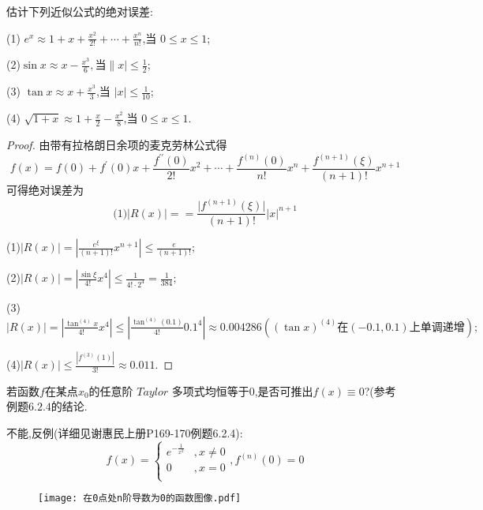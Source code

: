 \documentclass[lang=cn,newtx,10pt,scheme=chinese]{../Template/elegantbook}
\begin{document}
\begin{exercise}
估计下列近似公式的绝对误差:

(1) \(e^{x}\approx1 + x+\frac{x^{2}}{2!}+\cdots+\frac{x^{n}}{n!}\),当 \(0\leq x\leq1\);

(2)$\sin x\approx x-\frac{x^3}{6},当\|x|\le\frac{1}{2}$;

(3) \(\tan x\approx x+\frac{x^{3}}{3}\),当 \(\vert x\vert\leq\frac{1}{10}\);

(4) \(\sqrt{1 + x}\approx1+\frac{x}{2}-\frac{x^{2}}{8}\),当 \(0\leq x\leq1\).
\begin{proof}
    由带有拉格朗日余项的麦克劳林公式得
    \begin{equation}
    f(x)=f(0)+f^{\prime}(0)x+\frac{f^{\prime\prime}(0)}{2!}x^{2}+\cdots+\frac{f^{(n)}(0)}{n!}x^{n}+\frac{f^{(n + 1)}(\xi)}{(n + 1)!}x^{n + 1}
    \nonumber
    \end{equation}
    可得绝对误差为
    \begin{equation}
        \mathbf{(}1)|R\left( x \right) |==\frac{\vert f^{(n + 1)}(\xi)\vert}{(n + 1)!}\vert x\vert^{n + 1}
        \nonumber
    \end{equation}

        (1)$|R\left( x \right) |=\left| \frac{e^{\xi}}{\left( n+1 \right) !}x^{n+1} \right|\le \frac{e}{\left( n+1 \right) !};$
        
        (2)$|R\left( x \right) |=\left| \frac{\sin \xi}{4!}x^4 \right|\le \frac{1}{4!\cdot 2^4}=\frac{1}{384};$

        (3)$|R\left( x \right) |=\left| \frac{\tan ^{\left( 4 \right)}x}{4!}x^4 \right|\le \left| \frac{\tan ^{\left( 4 \right)}\left( 0.1 \right)}{4!}0.1^4 \right|\approx 0.004286 \left( \left( \tan x \right) ^{\left( 4 \right)}\text{在}\left( -0.1,0.1 \right) \text{上单调递增} \right) ;$
        
        (4)$|R\left( x \right) |\le \frac{\left| f^{\left( 3 \right)}\left( 1 \right) \right|}{3!}\approx 0.011.$
\end{proof}
\end{exercise}

\begin{exercise}
    若函数\(f\)在某点\(x_0\)的任意阶 $Taylor$ 多项式均恒等于\(0\),是否可推出\(f(x)\equiv0\)?(参考例题\(6.2.4\)的结论.
    \begin{solution}
        不能,反例(详细见谢惠民上册P169-170例题6.2.4):
        \begin{equation}
            f\left( x \right) =\begin{cases}
            e^{-\frac{1}{x^2}}&,x\ne 0\\
            0&,x=0\\
        \end{cases}
        ,f^{(n)}(0)=0
        \nonumber
        \end{equation}
        \begin{figure}[htbp]
            \centering
            \texttt{[image: 在0点处n阶导数为0的函数图像.pdf]}
        \end{figure}            
    \end{solution}
\end{exercise}
\end{document}
